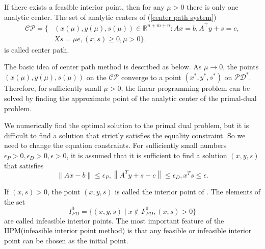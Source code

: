 If there exists a feasible interior point, then for any $\mu > 0$ there is only one analytic center. The set of analytic centers of (\ref{center path system})
\begin{align*}
    \mathcal{CP} = \{ &(x(\mu), y(\mu), s(\mu)) \in \mathbb{R}^{n+m+n}: A x = b, A^{\top} y + s = c, \\
    &X s=\mu e, (x,s) \geq 0, \mu > 0\}.
\end{align*}
is called center path.

The basic idea of center path method is described as below. As $\mu \rightarrow 0$, the points $(x(\mu), y(\mu), s(\mu))$ on the $\mathcal{CP}$ converge to a point $(x^*, y^*, s^*)$ on $\mathcal{PD^*}$. Therefore, for sufficiently small $\mu > 0$, the linear programming problem can be solved by finding the approximate point of the analytic center of the primal-dual problem.

We numerically find the optimal solution to the primal dual problem, but it is difficult to find a solution that strictly satisfies the equality constraint. So we need to change the equation constraints. For sufficiently small numbers $\epsilon_P>0, \epsilon_D>0, \epsilon>0$, it is assumed that it is sufficient to find a solution $(x,y,s)$ that satisfies 
$$
\| A  x- b\| \leq \epsilon_P,\left\| A^T  y+ s- c\right\| \leq \epsilon_D,  x^T  s \leq \epsilon.
$$


If $(x,s)>0$, the point $(x,y,s)$ is called the interior point of . The elements of the set
$$
I_{PD}^0 = \{(x,y,s) \mid x\notin F_{PD}^{0}, (x,s)>0\}
$$
are called infeasible interior points. The most important feature of the IIPM(infeasible interior point method) is that any feasible or infeasible interior point can be chosen as the initial point.

